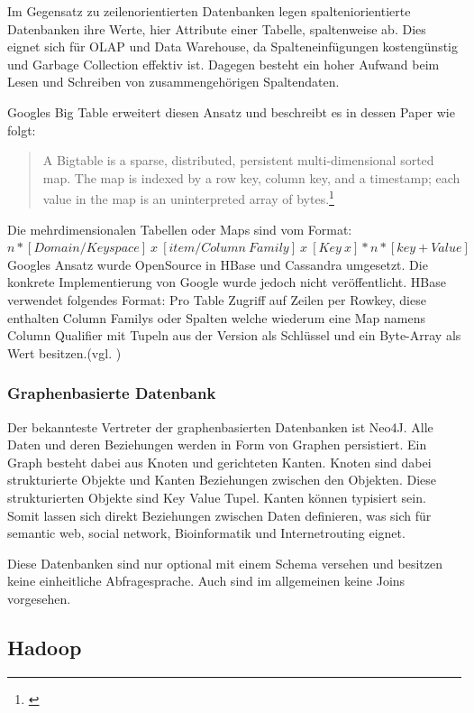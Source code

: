 Im Gegensatz zu zeilenorientierten Datenbanken legen spalteniorientierte Datenbanken ihre Werte, hier Attribute einer Tabelle, spaltenweise ab.
Dies eignet sich für OLAP und Data Warehouse, da Spalteneinfügungen kostengünstig und Garbage Collection effektiv ist.
Dagegen besteht ein hoher Aufwand beim Lesen und Schreiben von zusammengehörigen Spaltendaten.

Googles Big Table erweitert diesen Ansatz und beschreibt es in dessen Paper wie folgt:
\begin{quote}
A  Bigtable  is  a  sparse,  distributed,  persistent  multi-dimensional sorted map. The map is indexed by a row key, column key, and a timestamp; each value in the map is an uninterpreted array of bytes.\footnote{\cite[S.1]{paper:bigtable}}
\end{quote}
Die mehrdimensionalen Tabellen oder Maps sind vom Format:\\
$n*[Domain / Keyspace]\ x\ [item / Column\ Family]\ x\ [Key\ x]*n*[key+Value]$
Googles Ansatz wurde OpenSource in HBase und Cassandra umgesetzt. Die konkrete Implementierung von Google wurde jedoch nicht veröffentlicht.
HBase verwendet folgendes Format: Pro Table Zugriff auf Zeilen per Rowkey, diese enthalten Column Familys oder Spalten welche wiederum eine Map namens Column Qualifier mit Tupeln aus der Version als Schlüssel und ein Byte-Array als Wert besitzen.(vgl. \cite[S.13]{ba:dan})

\subsubsection{Graphenbasierte Datenbank}

Der bekannteste Vertreter der graphenbasierten Datenbanken ist Neo4J.
Alle Daten und deren Beziehungen werden in Form von Graphen persistiert.
Ein Graph besteht dabei aus Knoten und gerichteten Kanten.
Knoten sind dabei strukturierte Objekte und Kanten Beziehungen zwischen den Objekten.
Diese strukturierten Objekte sind Key Value Tupel.
Kanten können typisiert sein.
Somit lassen sich direkt Beziehungen zwischen Daten definieren, was sich für semantic web, social network, Bioinformatik und Internetrouting eignet.

Diese Datenbanken sind nur optional mit einem Schema versehen und besitzen keine einheitliche Abfragesprache.
Auch sind im allgemeinen keine Joins vorgesehen.


\subsection{Hadoop}
\label{hadoop}

